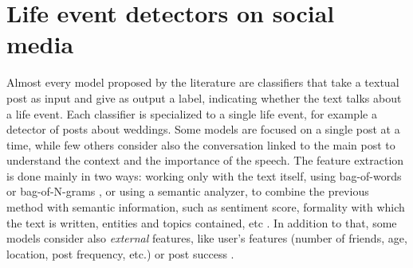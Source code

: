 \section{Life event detectors on social media}
\label{sec:socialmediadetectors}
Almost every model proposed by the literature are classifiers that take a textual post as input and give as output a label, indicating whether the text talks about a life event. Each classifier is specialized to a single life event, for example a detector of posts about weddings. Some models are focused on a single post at a time, while few others \cite{cavalin2015multiple, moyanolife} consider also the conversation linked to the main post to understand the context and the importance of the speech. The feature extraction is done mainly in two ways: working only with the text itself, using bag-of-words or bag-of-N-grams \cite{cavalinclassification, di2013detecting, li2014major}, or using a semantic analyzer, to combine the previous method with semantic information, such as sentiment score, formality with which the text is written, entities and topics contained, etc \cite{khobarekar2013detecting}. In addition to that, some models consider also \emph{external} features, like user's features (number of friends, age, location, post frequency, etc.) or post success \cite{dickinson2015identifying}.

